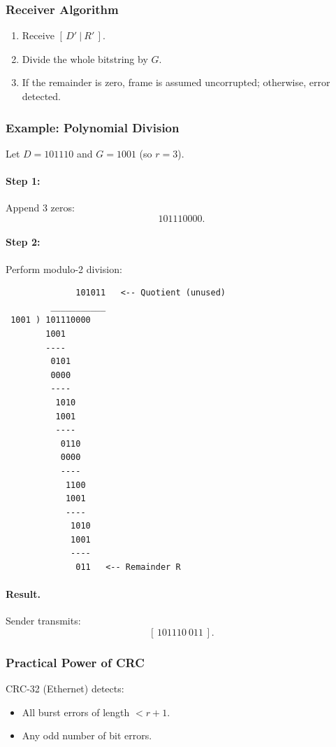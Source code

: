 \documentclass[12pt]{article}
\begin{document}
\subsubsection{Receiver Algorithm}

\begin{enumerate}
    \item Receive $[\, D' \ | \ R' \,]$.
    \item Divide the whole bitstring by $G$.
    \item If the remainder is zero, frame is assumed uncorrupted; otherwise, error detected.
\end{enumerate}

\subsubsection{Example: Polynomial Division}

Let $D = 101110$ and $G = 1001$ (so $r=3$).

\paragraph{Step 1:} Append 3 zeros:
\[
    101110000.
\]

\paragraph{Step 2:} Perform modulo-2 division:

\begin{verbatim}
              101011   <-- Quotient (unused)
         ___________
 1001 ) 101110000
        1001
        ----
         0101
         0000
         ----
          1010
          1001
          ----
           0110
           0000
           ----
            1100
            1001
            ----
             1010
             1001
             ----
              011   <-- Remainder R
\end{verbatim}

\paragraph{Result.}
Sender transmits:
\[
    [\,101110\ 011\,].
\]

\subsubsection{Practical Power of CRC}

CRC-32 (Ethernet) detects:
\begin{itemize}
    \item All burst errors of length $< r+1$.
    \item Any odd number of bit errors.
\end{itemize}
\end{document}
